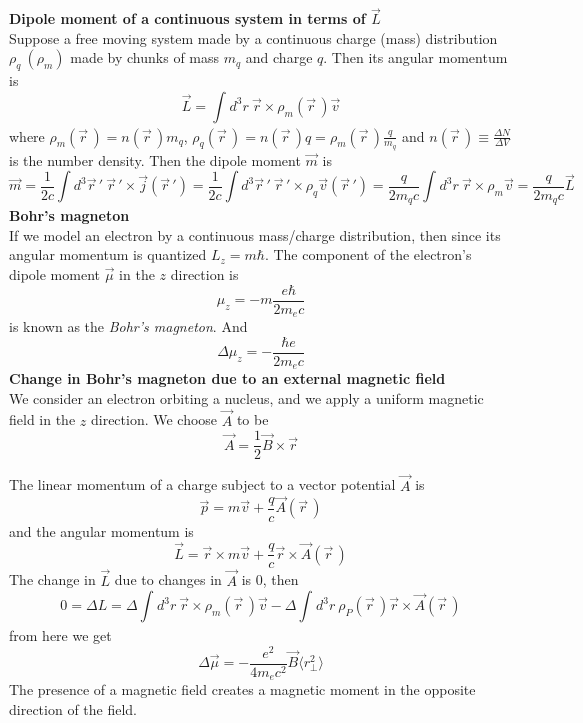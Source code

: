\documentclass[12pt,a4paper]{article}
\newcommand{\integral}[3]{\int_{#1}^{#2} d #3 \ } %
\begin{document}
\textbf{Dipole moment of a continuous system in terms of $\vec{L}$}\\
Suppose a free moving system made by a continuous charge (mass) distribution $\rho_q \ (\rho_m)$ made by chunks of mass $m_q$ and charge $q$. Then its angular momentum is
\begin{equation}
	\vec{L} = \integral{}{}{^3r} \vec{r} \times \rho_m(\vec{r}\,) \vec{v}
	\end{equation}
where $\rho_m(\vec{r}\,) = n(\vec{r}\,)m_q$, $\rho_q(\vec{r}\,) = n(\vec{r}\,)q = \rho_m(\vec{r}\,) \frac{q}{m_q}$ and $n(\vec{r}\,) \equiv \frac{\Delta N}{\Delta V}$ is the number density. Then the dipole moment $\vec{m}$ is
\begin{equation}
	\vec{m} = \frac{1}{2c} \int d^3 \vec{r}\,' \ \vec{r}\,'\times \vec{j}(\vec{r}\, ') = \frac{1}{2c} \int d^3 \vec{r}\,' \ \vec{r}\,'\times \rho_q\vec{v}(\vec{r}\, ') = \frac{q}{2m_qc}\integral{}{}{^3r} \vec{r}\times \rho_m \vec{v} = \frac{q}{2m_qc} \vec{L}
\end{equation}
\textbf{Bohr's magneton}\\
If we model an electron by a continuous mass/charge distribution, then since its angular momentum is quantized $L_z = m\hbar$. The component of the electron's dipole moment $\vec{\mu}$ in the $z$ direction is
\begin{equation}
	\mu_z = -m \frac{e\hbar}{2m_e c}
\end{equation} 
is known as the \textit{Bohr's magneton}. And 
\begin{equation}
\Delta \mu_z = -\frac{\hbar e}{2m_e c}
\end{equation}
\textbf{Change in Bohr's magneton due to an external magnetic field}\\
We consider an electron orbiting a nucleus, and we apply a uniform magnetic field in the $z$ direction. We choose $ \vec{A}$ to be
\begin{equation}
	\vec{A} = \frac{1}{2} \vec{B} \times  \vec{r}
\end{equation}

The linear momentum of a charge subject to a vector potential $\vec{A}$ is
\begin{equation}
	\vec{p} = m\vec{v} + \frac{q}{c} \vec{A}(\vec{r}\,)
\end{equation}
and the angular momentum is
\begin{equation}
	\vec{L} = \vec{r}\times m\vec{v} + \frac{q}{c} \vec{r}\times\vec{A}(\vec{r}\,)
\end{equation}
The change in $\vec{L}$ due to changes in $\vec{A}$ is 0, then 
\begin{equation}
	0 = \Delta L = \Delta \integral{}{}{^3r} \vec{r} \times \rho_m(\vec{r}\,) \vec{v} -\Delta \integral{}{}{^3r} \rho_P(\vec{r}\,)\vec{r}\times \vec{A}(\vec{r}\,)
\end{equation}
from here we get
\begin{equation}
	\Delta \vec{\mu} = -\frac{e^2}{4m_e c^2} \vec{B}\langle r_{\perp}^2 \rangle
\end{equation}
The presence of a magnetic field creates a magnetic moment in the opposite direction of the field.
\end{document}
